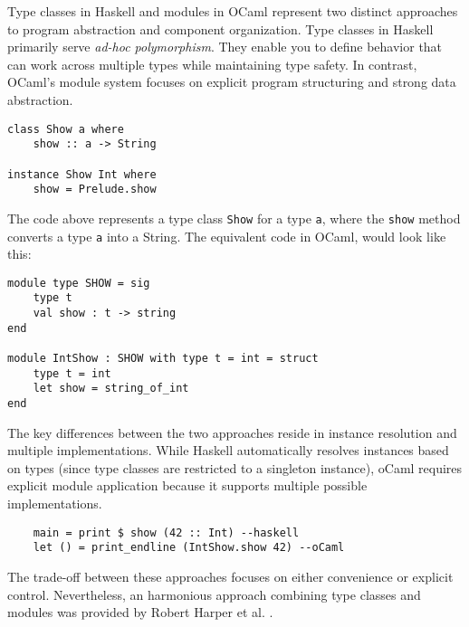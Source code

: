 

Type classes in Haskell and modules in OCaml represent two distinct approaches to program abstraction and component organization. Type classes in Haskell primarily serve \textit{ad-hoc polymorphism}. They enable you to define behavior that can work across multiple types while maintaining type safety. 
In contrast, OCaml's module system focuses on explicit program structuring and strong data abstraction. 

\begin{lstlisting}
class Show a where
    show :: a -> String

instance Show Int where
    show = Prelude.show
\end{lstlisting}

The code above represents a type class \lstinline|Show| for a type \lstinline|a|, where the \lstinline|show| method converts a type \lstinline|a| into a String. The equivalent code in OCaml, would look like this:
\begin{lstlisting}
module type SHOW = sig
    type t
    val show : t -> string
end

module IntShow : SHOW with type t = int = struct
    type t = int
    let show = string_of_int
end
\end{lstlisting}

The key differences between the two approaches reside in instance resolution and multiple implementations. While Haskell automatically resolves instances based on types (since type classes are restricted to a singleton instance), oCaml requires explicit module application because it supports multiple possible implementations.

\begin{lstlisting}
    main = print $ show (42 :: Int) --haskell
    let () = print_endline (IntShow.show 42) --oCaml
\end{lstlisting}

The trade-off between these approaches focuses on either convenience or explicit control. Nevertheless, an harmonious approach combining type classes and modules was provided by Robert Harper et al. .

